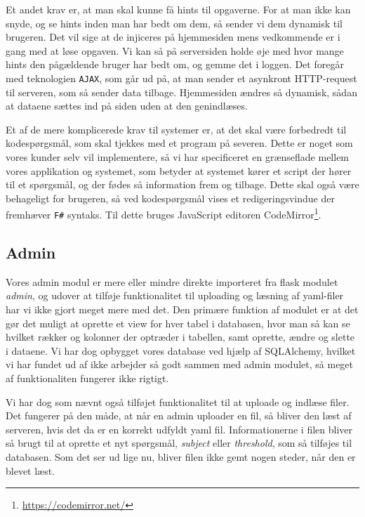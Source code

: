 \documentclass[11pt, a4paper]{article}
\begin{document}
Et andet krav er, at man skal kunne få hints til opgaverne. For at man ikke kan snyde, og se hints inden man har bedt om dem, så sender vi dem dynamisk til brugeren. Det vil sige at de injiceres på hjemmesiden mens vedkommende er i gang med at løse opgaven. Vi kan så på serversiden holde øje med hvor mange hints den pågældende bruger har bedt om, og gemme det i loggen. Det foregår med teknologien \verb!AJAX!, som går ud på, at man sender et asynkront HTTP-request til serveren, som så sender data tilbage. Hjemmesiden ændres så dynamisk, sådan at dataene sættes ind på siden uden at den genindlæses.

Et af de mere komplicerede krav til systemer er, at det skal være forbedredt til kodespørgsmål, som skal tjekkes med et program på severen. Dette er noget som vores kunder selv vil implementere, så vi har specificeret en grænseflade mellem vores applikation og systemet, som betyder at systemet kører et script der hører til et spørgsmål, og der fødes så information frem og tilbage. Dette skal også være behageligt for brugeren, så ved kodespørgsmål vises et redigeringsvindue der fremhæver \verb!F#! syntaks. Til dette bruges JavaScript editoren CodeMirror\footnote{\url{https://codemirror.net/}}.

\subsection{Admin}
\label{sub:admin}
Vores admin modul er mere eller mindre direkte importeret fra flask modulet \emph{admin}, og udover at tilføje funktionalitet til uploading og læsning af yaml-filer har vi ikke gjort meget mere med det. Den primære funktion af modulet er at det gør det muligt at oprette et view for hver tabel i databasen, hvor man så kan se hvilket rækker og kolonner der optræder i tabellen, samt oprette, ændre og slette i dataene. Vi har dog opbygget vores database ved hjælp af SQLAlchemy, hvilket vi har fundet ud af ikke arbejder så godt sammen med admin modulet, så meget af funktionaliten fungerer ikke rigtigt.

Vi har dog som nævnt også tilføjet funktionalitet til at uploade og indlæse filer. Det fungerer på den måde, at når en admin uploader en fil, så bliver den læst af serveren, hvis det da er en korrekt udfyldt yaml fil. Informationerne i filen bliver så brugt til at oprette et nyt spørgsmål, \emph{subject} eller \emph{threshold}, som så tilføjes til databasen. Som det ser ud lige nu, bliver filen ikke gemt nogen steder, når den er blevet læst.
\end{document}
